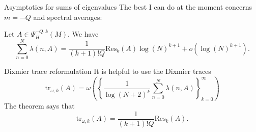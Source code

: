 \documentclass{beamer}
\numberwithin{equation}{section}
\theoremstyle{plain}
\theoremstyle{plain}
\theoremstyle{definition}
\theoremstyle{plain}
\theoremstyle{plain}
\theoremstyle{definition}
\newcommand{\tr}{\mathrm{tr}}
\newcommand{\Res}{\mathrm{Res}}
\begin{document}
\begin{frame}{Asymptotics for sums of eigenvalues}
    The best I can do at the moment concerns $m=-Q$ and spectral averages:
    \begin{theorem}[M. (2026)]
        Let $A \in \Psi^{-Q,k}_H(M).$ We have
        \[
            \sum_{n=0}^N \lambda(n,A) = \frac{1}{(k+1)!Q}\Res_k(A)\log(N)^{k+1}+o(\log(N)^{k+1}).
        \]
    \end{theorem}
\end{frame}

\begin{frame}{Dixmier trace reformulation}
    It is helpful to use the Dixmier traces
    \[
        \tr_{\omega,k}(A) = \omega\left(\left\{\frac{1}{\log(N+2)^k}\sum_{n=0}^N \lambda(n,A)\right\}_{k=0}^\infty\right)
    \]
    The theorem says that
    \[
        \tr_{\omega,k}(A) = \frac{1}{(k+1)!Q}\Res_k(A).
    \]
\end{frame}


\begin{frame}
\end{frame}
\end{document}
